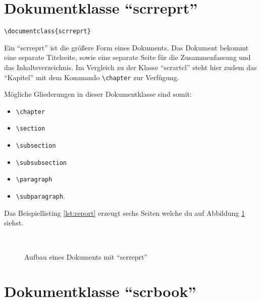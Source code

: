 \section{Dokumentklasse \enquote{scrreprt}}

\begin{lstlisting}
\documentclass{scrreprt}
\end{lstlisting}

Ein \enquote{scrreprt} ist die größere Form eines Dokuments. Das Dokument bekommt eine separate Titelseite, sowie eine separate Seite für die Zusammenfassung und das Inhaltsverzeichnis. Im Vergleich zu der Klasse \enquote{scrartcl} steht hier zudem das \enquote{Kapitel} mit dem Kommando \texttt{\textbackslash chapter} zur Verfügung.

Mögliche Gliederungen in dieser Dokumentklasse sind somit:

\begin{itemize}
	\item \texttt{\textbackslash chapter}
	\item \texttt{\textbackslash section}
	\item \texttt{\textbackslash subsection}
	\item \texttt{\textbackslash subsubsection}
	\item \texttt{\textbackslash paragraph}
	\item \texttt{\textbackslash subparagraph}.
\end{itemize}

Das Beispiellisting \ref{lst:report} erzeugt sechs Seiten welche du auf Abbildung \ref{fig:report} siehst.

\begin{figure}[htb]
	\begin{center}
		 \\
	\end{center}
	\caption{Aufbau eines Dokuments mit \enquote{scrreprt}}
	\label{fig:report}
\end{figure}


\section{Dokumentklasse \enquote{scrbook}}

